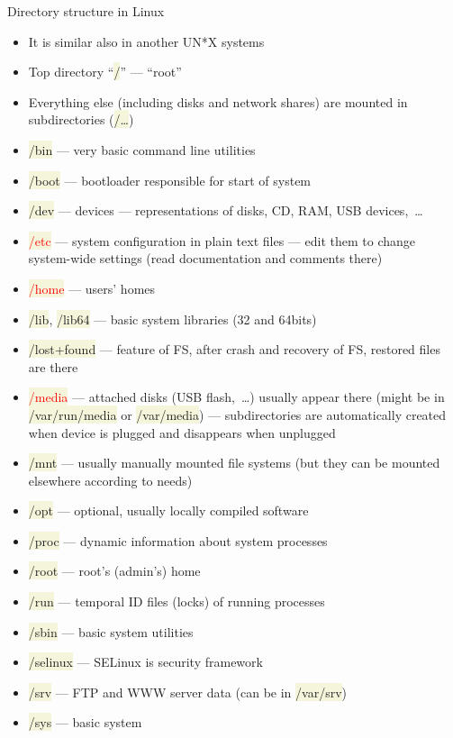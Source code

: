 \documentclass[compress, ucs, xelatex, 11pt, xcolor=svgnames, aspectratio=169,
	hyperref={
		bookmarks=true,
		unicode=true,
		colorlinks=true,
		pdftitle={Linux, command line and MetaCentrum},
		plainpages=false,
		pdfauthor={Vojtech Zeisek},
		pdfsubject={Course about use of Linux command line, writing shell scripts and using MetaCentrum of CESNET},
		pdfcreator={XeLaTeX},
		pdfkeywords={Linux, GNU, BASH, shell, command line, MetaCentrum},
		linkcolor=DarkRed, %
		anchorcolor=DarkBlue, %
		citecolor=Indigo, %
		filecolor=NavyBlue, %
		menucolor=DarkMagenta, %
		urlcolor=DarkBlue, %
		pdftex},
	url={hyphens, lowtilde} %
	]{beamer}
\renewcommand{\texttt}[1]{\colorbox{Beige}{{\ttfamily #1}}}
\renewcommand{\alert}[1]{\textcolor{red}{#1}}
\begin{document}
\begin{frame}[allowframebreaks]{Directory structure in Linux}
	\begin{itemize}
		\item It is similar also in another UN*X systems
		\item Top directory \enquote{\texttt{/}} --- \enquote{root}
		\item Everything else (including disks and network shares) are mounted in subdirectories (\texttt{/\ldots})
		\item \texttt{/bin} --- very basic command line utilities
		\item \texttt{/boot} --- bootloader responsible for start of system
		\item \texttt{/dev} --- devices --- representations of disks, CD, RAM, USB devices,~\ldots
		\item \alert{\texttt{/etc}} --- system configuration in plain text files --- edit them to change system-wide settings (read documentation and comments there)
		\item \alert{\texttt{/home}} --- users' homes
		\item \texttt{/lib}, \texttt{/lib64} --- basic system libraries (32 and 64bits)
		\item \texttt{/lost+found} --- feature of FS, after crash and recovery of FS, restored files are there
		\item \alert{\texttt{/media}} --- attached disks (USB flash,~\ldots) usually appear there (might be in \texttt{/var/run/media} or  \texttt{/var/media}) --- subdirectories are automatically created when device is plugged and disappears when unplugged
		\item \texttt{/mnt} --- usually manually mounted file systems (but they can be mounted elsewhere according to needs)
		\item \texttt{/opt} --- optional, usually locally compiled software
		\item \texttt{/proc} --- dynamic information about system processes
		\item \texttt{/root} --- root's (admin's) home
		\item \texttt{/run} --- temporal ID files (locks) of running processes
		\item \texttt{/sbin} --- basic system utilities
		\item \texttt{/selinux} --- SELinux is security framework
		\item \texttt{/srv} --- FTP and WWW server data (can be in \texttt{/var/srv})
		\item \texttt{/sys} --- basic system

\end{itemize}
\end{frame}
\end{document}
